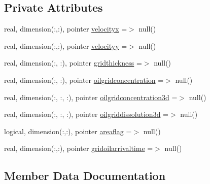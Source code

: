 \subsection*{Private Attributes}
\begin{DoxyCompactItemize}
\item 
real, dimension(\+:,\+:), pointer \mbox{\hyperlink{structmodulelagrangianglobal_1_1t__oilspreading_af6e742ea5eaf98a975b67b41266bfa3c}{velocityx}} =$>$ null()
\item 
real, dimension(\+:,\+:), pointer \mbox{\hyperlink{structmodulelagrangianglobal_1_1t__oilspreading_a0e46af821f66ab85a5884f0670728a6d}{velocityy}} =$>$ null()
\item 
real, dimension(\+:, \+:), pointer \mbox{\hyperlink{structmodulelagrangianglobal_1_1t__oilspreading_aef5f69d6b42b80d1954a31fadcb8a862}{gridthickness}} =$>$ null()
\item 
real, dimension(\+:, \+:), pointer \mbox{\hyperlink{structmodulelagrangianglobal_1_1t__oilspreading_a54787a75452f7d2e11d26ddf63b46a2e}{oilgridconcentration}} =$>$ null()
\item 
real, dimension(\+:, \+:, \+:), pointer \mbox{\hyperlink{structmodulelagrangianglobal_1_1t__oilspreading_a95d15cb24293e17410e295d0fa01fa54}{oilgridconcentration3d}} =$>$ null()
\item 
real, dimension(\+:, \+:, \+:), pointer \mbox{\hyperlink{structmodulelagrangianglobal_1_1t__oilspreading_a5291d663d6ff94a8632d87f8ca7af13c}{oilgriddissolution3d}} =$>$ null()
\item 
logical, dimension(\+:,\+:), pointer \mbox{\hyperlink{structmodulelagrangianglobal_1_1t__oilspreading_a454a8133bb2ae5315f1fbd8b759b959d}{areaflag}} =$>$ null()
\item 
real, dimension(\+:,\+:), pointer \mbox{\hyperlink{structmodulelagrangianglobal_1_1t__oilspreading_ac72b6490c0ce715f814088039cad3777}{gridoilarrivaltime}} =$>$ null()
\end{DoxyCompactItemize}


\subsection{Member Data Documentation}
\mbox{\label{structmodulelagrangianglobal_1_1t__oilspreading_a454a8133bb2ae5315f1fbd8b759b959d}} 

